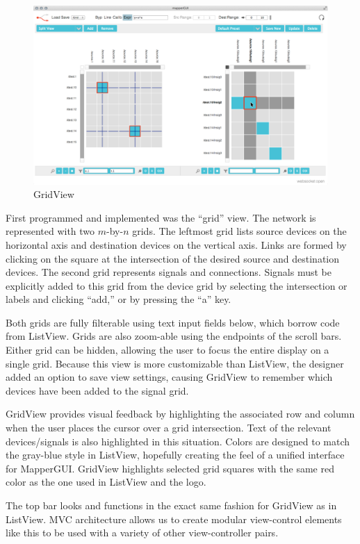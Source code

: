 \begin{figure}[ht]
\centering
	\includegraphics[width=\textwidth]{figures/grid_w_cursor}
\caption{GridView}
\label{fig:grid}
\end{figure}

First programmed and implemented was the ``grid'' view. The network is represented with two $m$-by-$n$ grids. The leftmost grid lists source devices on the horizontal axis and destination devices on the vertical axis. Links are formed by clicking on the square at the intersection of the desired source and destination devices. The second grid represents signals and connections. Signals must be explicitly added to this grid from the device grid by selecting the intersection or labels and clicking ``add,'' or by pressing the ``a'' key. 

Both grids are fully filterable using text input fields below, which borrow code from ListView. Grids are also zoom-able using the endpoints of the scroll bars. Either grid can be hidden, allowing the user to focus the entire display on a single grid. Because this view is more customizable than ListView, the designer added an option to save view settings, causing GridView to remember which devices have been added to the signal grid.

GridView provides visual feedback by highlighting the associated row and column when the user places the cursor over a grid intersection. Text of the relevant devices/signals is also highlighted in this situation. Colors are designed to match the gray-blue style in ListView, hopefully creating the feel of a unified interface for MapperGUI. GridView highlights selected grid squares with the same red color as the one used in ListView and the logo.

The top bar looks and functions in the exact same fashion for GridView as in ListView. MVC architecture allows us to create modular view-control elements like this to be used with a variety of other view-controller pairs.

